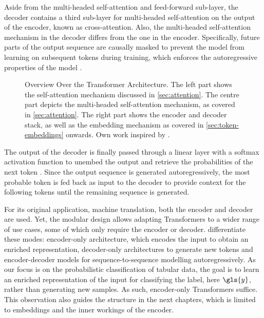 Aside from the multi-headed self-attention and feed-forward sub-layer, the decoder contains a third sub-layer for multi-headed self-attention on the output of the encoder, known as cross-attention. Also, the multi-headed self-attention mechanism in the decoder differs from the one in the encoder. Specifically, future parts of the output sequence are causally masked to prevent the model from learning on subsequent \glspl{token} during training, which enforces the autoregressive properties of the model \autocites[][3]{vaswaniAttentionAllYou2017}[][15]{narangTransformerModificationsTransfer2021}.

\begin{landscape}
  \begin{figure}[ht]
    \begin{center}
      {\renewcommand\normalsize{\scriptsize\sf}%
      \normalsize
      }
    \end{center}
    \caption[Overview Over the Transformer Architecture]{Overview Over the Transformer Architecture. The left part shows the self-attention mechanism discussed in \cref{sec:attention}. The centre part depicts the multi-headed self-attention mechanism, as covered in \cref{sec:attention}. The right part shows the encoder and decoder stack, as well as the \gls{embedding} mechanism as covered in \cref{sec:token-embeddings} onwards. Own work inspired by \textcite[][3]{tayEfficientTransformersSurvey2022}.}
    \label{fig:transformer-architecture-overview}
  \end{figure}
\end{landscape}
The output of the decoder is finally passed through a linear layer with a softmax activation function to unembed the output and retrieve the probabilities of the next \gls{token} \autocite[][5]{vaswaniAttentionAllYou2017}. Since the output sequence is generated autoregressively, the most probable \gls{token} is fed back as input to the decoder to provide context for the following \glspl{token} until the remaining sequence is generated.

For its original application, machine translation, both the encoder and decoder are used. Yet, the modular design allows adapting Transformers to a wider range of use cases, some of which only require the encoder or decoder. \textcite[][16--17]{raffelExploringLimitsTransfer2020} differentiate these modes: encoder-only architecture, which encodes the input to obtain an enriched representation, decoder-only architectures to generate new \glspl{token} and encoder-decoder models for sequence-to-sequence modelling autoregressively. As our focus is on the probabilistic classification of tabular data, the goal is to learn an enriched representation of the input for classifying the label, here $\gls{y}$, rather than generating new samples. As such, encoder-only Transformers suffice. This observation also guides the structure in the next chapters, which is limited to \glspl{embedding} and the inner workings of the encoder.

